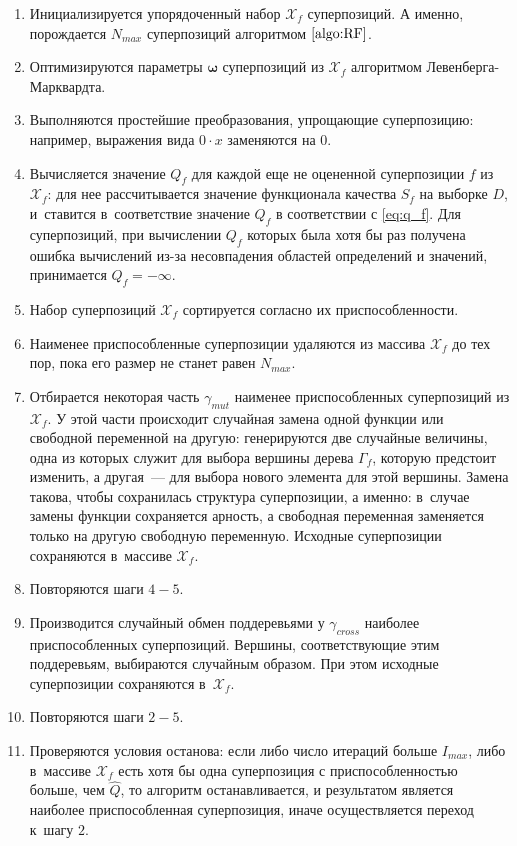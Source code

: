 \documentclass[12pt,a4paper]{article}
\begin{document}
\begin{enumerate}
  \item Инициализируется упорядоченный набор $\mathcal{X}_f$ суперпозиций.
	А именно, порождается $N_{max}$ суперпозиций алгоритмом $\ref{algo:RF}$.
  \item Оптимизируются параметры $\boldsymbol{\omega}$ суперпозиций
	из $\mathcal{X}_f$ алгоритмом Левенберга-Марквардта.
  \item Выполняются простейшие преобразования, упрощающие суперпозицию:
	например, выражения вида $0 \cdot x$ заменяются на $0$.
  \item Вычисляется значение $Q_f$ для каждой еще не оцененной суперпозиции
	$f$ из $\mathcal{X}_f$: для нее рассчитывается значение функционала качества
	$S_f$ на выборке $D$, и~ставится
	в~соответствие значение $Q_f$ в соответствии с \eqref{eq:q_f}. Для
	суперпозиций, при вычислении $Q_f$ которых была хотя бы раз получена
	ошибка вычислений из-за несовпадения областей определений и значений,
	принимается $Q_f = -\infty$.
  \item Набор суперпозиций $\mathcal{X}_f$ сортируется согласно их
	приспособленности.
  \item Наименее приспособленные суперпозиции удаляются из массива
	$\mathcal{X}_f$ до тех пор, пока его размер не станет равен $N_{max}$.
  \item Отбирается некоторая часть $\gamma_{mut}$ наименее приспособленных
	суперпозиций из $\mathcal{X}_f$. У этой части происходит случайная замена
	одной функции или свободной переменной на другую: генерируются две случайные величины,
	одна из которых служит для выбора вершины дерева $\Gamma_f$, которую
	предстоит изменить, а другая~--- для выбора нового элемента для этой вершины.
	Замена такова, чтобы сохранилась структура суперпозиции, а именно:
	в~случае замены функции сохраняется арность, а свободная переменная
	заменяется только на другую свободную переменную. Исходные
	суперпозиции сохраняются в~массиве $\mathcal{X}_f$.
  \item Повторяются шаги $4-5$.
  \item Производится случайный обмен поддеревьями у $\gamma_{cross}$ наиболее
	приспособленных суперпозиций. Вершины, соответствующие этим поддеревьям,
	выбираются случайным образом. При этом исходные суперпозиции сохраняются
	в~$\mathcal{X}_f$.
  \item Повторяются шаги $2-5$.
  \item Проверяются условия останова: если либо число итераций больше
	$I_{max}$, либо в~массиве $\mathcal{X}_f$ есть хотя бы одна суперпозиция с
	приспособленностью больше, чем $\hat{Q}$, то алгоритм останавливается,
	и результатом является наиболее приспособленная суперпозиция, иначе
	осуществляется переход к~шагу $2$.
\end{enumerate}
\end{document}
